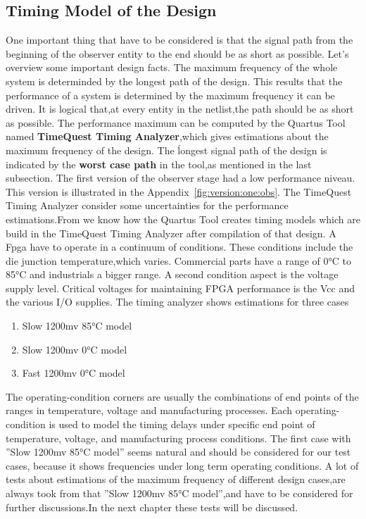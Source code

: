 \subsection{Timing Model of the Design}
One important thing that have to be considered is that the signal path from the beginning of the observer entity to the end should be as short as possible.
Let's overview some important design facts.\newline
The maximum frequency of the whole system is determinded by the longest path of the design. This results that the performance of a system is determined by the maximum frequency
it can be driven. It is logical that,at every entity in the netlist,the path should be as short as possible.
The performance maximum can be computed by the Quartus Tool named \textbf{TimeQuest Timing Analyzer},which gives estimations about the maximum frequency of the design.
The ĺongest signal path of the design is indicated by the \textbf{worst case path} in the tool,as mentioned in the last subsection. \newline
The first version of the observer stage had a low performance niveau. This version is illustrated in the Appendix~\ref{fig:version:one:obs}.
The TimeQuest Timing Analyzer consider some uncertainties for the performance estimations.From \cite{altera2} we know how the Quartus Tool creates timing models which are
build in the TimeQuest Timing Analyzer after compilation of that design.
A Fpga have to operate in a continuum of conditions. These conditions include the die junction temperature,which varies.
Commercial parts have a range of 0°C to 85°C and industrials a bigger range. 
A second condition aspect is the voltage supply level. Critical voltages for maintaining FPGA performance is the Vcc and the various I/O supplies.
\newline
The timing analyzer shows estimations for three cases
\begin{enumerate}
\item Slow 1200mv 85°C model
\item Slow 1200mv 0°C model
\item Fast 1200mv 0°C model
\end{enumerate}

The operating-condition corners are usually the combinations of end points of the ranges in temperature, voltage and manufacturing processes.
Each operating-condition is used to model the timing delays under specific end point of temperature, voltage, and manufacturing process conditions.
The first case with ''Slow 1200mv 85°C model'' seems natural and should be considered for our test cases, because it shows frequencies under long term 
operating conditions.
A lot of tests about estimations of the maximum frequency of different design cases,are always took from that ''Slow 1200mv 85°C model'',and have to be considered
for further discussions.In the next chapter these tests will be discussed.

